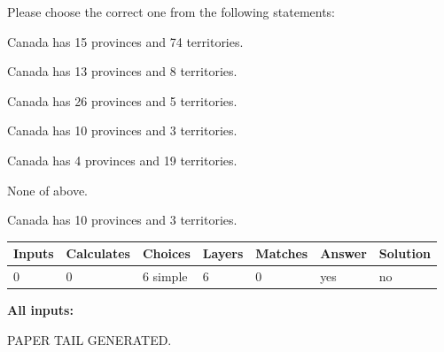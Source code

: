 \documentclass[12pt]{article}
\begin{document}
  
Please choose the correct one from the following statements:
 
 
Canada has  15 provinces and  74 territories.
 
 
Canada has  13 provinces and  8 territories.
 
 
Canada has  26 provinces and  5 territories.
 
 
Canada has 10  provinces and 3 territories.
 
 
Canada has   4 provinces and  19 territories.
 
 
 None of above.
 
 
\noindent{}
 
 
Canada has 10  provinces and 3 territories.
 
 
\noindent{}
 
 
   
   
   
   
\noindent\begin{tabular}{|l|l|l|l|l|l|l|}
 \hline
Inputs & Calculates & Choices & Layers & Matches & Answer & Solution \\ \hline
 0  & 
 0  & 
 6
  simple  
  & 
 6  & 
 0  & 
  yes & 
  no 
  \\ \hline
 \end{tabular}
   
   
   
   
\noindent{}
   
   
   
   
\noindent\vspace{0.1in}\hspace{-0.08in} {\textbf{\Large{All inputs: }}}
   
   
   
   
   
   
 \vspace{0.2in}
 
   
   
\vspace{2.0in} PAPER TAIL GENERATED.
   
   
   
\end{document}
